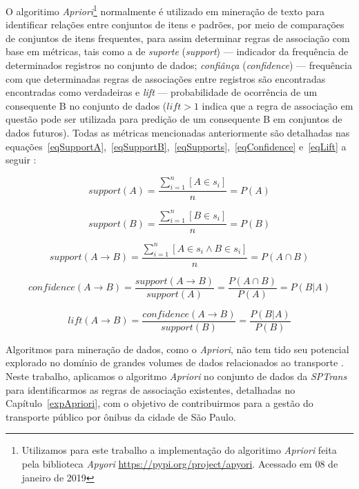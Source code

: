 \documentclass[
	12pt,				%
	oneside,			%
	a4paper,			%
	english,			%
	brazil				%
	]{abntex2ppgsi}
\begin{document}
{{{O algoritimo \textit{Apriori}\footnote{Utilizamos para este trabalho a implementação do algoritimo \textit{Apriori} feita pela biblioteca \textit{Apyori}  \url{https://pypi.org/project/apyori}. Acessado em 08 de janeiro de 2019} normalmente é utilizado em mineração de texto para identificar relações entre conjuntos de itens e padrões, por meio de comparações de conjuntos de itens frequentes, para assim determinar regras de associação com base em métricas, tais como a de \textit{suporte} (\textit{support}) --- indicador da frequência de determinados registros no conjunto de dados; \textit{confiânça} (\textit{confidence}) --- frequência com que determinadas regras de associações entre registros são encontradas encontradas como verdadeiras e \textit{lift} --- probabilidade de ocorrência de um consequente B no conjunto de dados ($lift > 1$ indica que a regra de associação em questão pode ser utilizada para predição de um consequente B em conjuntos de dados futuros). Todas as métricas mencionadas anteriormente são detalhadas nas equações~\ref{eqSupportA},~\ref{eqSupportB},~\ref{eqSupports},~\ref{eqConfidence} e~\ref{eqLift} a seguir  \cite{park2018apriori}:

\begin{equation}
\label{eqSupportA}
support(A) = \dfrac{\sum_{i=1}^{n}[A \in s_i]} {n} = P(A) 
\end{equation}

\begin{equation}
\label{eqSupportB}
support(B) = \dfrac{\sum_{i=1}^{n}[B \in s_i]} {n} = P(B) 
\end{equation}

\begin{equation}
\label{eqSupports}
support(A \rightarrow B) = \dfrac{\sum_{i=1}^{n}[A \in s_i \land B \in s_i]} {n} = P(A \cap B)
\end{equation}

\begin{equation}
\label{eqConfidence}
confidence(A \rightarrow B) = \dfrac{support(A \rightarrow B)}{support(A)} = \dfrac{P(A \cap B)}{P(A)} = P(B|A)
\end{equation}

\begin{equation}
\label{eqLift}
lift(A \rightarrow B) = \dfrac{confidence(A \rightarrow B)}{support(B)} = \dfrac{P(B|A)}{P(B)}
\end{equation}

Algoritmos para mineração de dados, como o \textit{Apriori}, não tem tido seu potencial explorado no domínio de grandes volumes de dados relacionados ao transporte \cite{park2018apriori}. Neste trabalho, aplicamos o algoritmo \textit{Apriori} no conjunto de dados da \textit{SPTrans} para identificarmos as regras de associação existentes, detalhadas no Capítulo~\ref{expApriori}, com o objetivo de contribuirmos para a gestão do transporte público por ônibus da cidade de São Paulo.   

}}}
\end{document}

